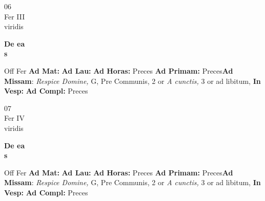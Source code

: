 \documentclass[10pt, openany]{book}
\begin{document}
        \begin{center}
            \begin{minipage}{3.5in}
                \vspace{2em}
                \begin{minipage}{0.5in}
                    {\Huge 06} \\
                    {\normalsize Fer III} \\
                    {\normalsize viridis}
                \end{minipage}
                \begin{minipage}{3.0in}
                    \textbf{ \large De ea \\
                    \textnormal{\normalsize s}} \\ 
                \end{minipage}
                \begin{justify}Off Fer
                    \textbf{Ad Mat: }
                    \textbf{Ad Lau: }
                    \textbf{Ad Horas: }Preces
                    \textbf{Ad Primam: }Preces\textbf{Ad Missam}: \textit{Respice Domine,} G, Pre Communis, 2 or \textit{A cunctis,} 3 or ad libitum,  
                    \textbf{In Vesp: }
                    \textbf{Ad Compl: }Preces
                \end{justify}
            \end{minipage}
        \end{center}
    
        \begin{center}
            \begin{minipage}{3.5in}
                \vspace{2em}
                \begin{minipage}{0.5in}
                    {\Huge 07} \\
                    {\normalsize Fer IV} \\
                    {\normalsize viridis}
                \end{minipage}
                \begin{minipage}{3.0in}
                    \textbf{ \large De ea \\
                    \textnormal{\normalsize s}} \\ 
                \end{minipage}
                \begin{justify}Off Fer
                    \textbf{Ad Mat: }
                    \textbf{Ad Lau: }
                    \textbf{Ad Horas: }Preces
                    \textbf{Ad Primam: }Preces\textbf{Ad Missam}: \textit{Respice Domine,} G, Pre Communis, 2 or \textit{A cunctis,} 3 or ad libitum,  
                    \textbf{In Vesp: }
                    \textbf{Ad Compl: }Preces
                \end{justify}
            \end{minipage}
        \end{center}
    
\end{document}
